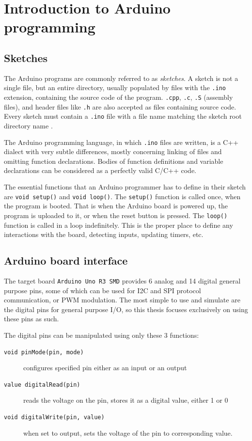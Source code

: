 \chapter{Introduction to Arduino programming} \label{ch:arduino}

\section{Sketches} \label{sec:sketches}

The Arduino programs are commonly referred to as \textit{sketches}. A sketch is not a single file, but an entire directory, usually populated by files with the \texttt{.ino} extension, containing the source code of the program. \texttt{.cpp}, \texttt{.c}, \texttt{.S} (assembly files), and header files like \texttt{.h} are also accepted as files containing source code. Every sketch must contain a \texttt{.ino} file with a file name matching the sketch root directory name \cite{arduino_sketch_specs}.

The Arduino programming language, in which \texttt{.ino} files are written, is a C++ dialect with very subtle differences, mostly concerning linking of files and omitting function declarations. Bodies of function definitions and variable declarations can be considered as a perfectly valid C/C++ code. 

The essential functions that an Arduino programmer has to define in their sketch are \texttt{void setup()} and \texttt{void loop()}. The \texttt{setup()} function is called once, when the program is booted. That is when the Arduino board is powered up, the program is uploaded to it, or when the reset button is pressed. The \texttt{loop()} function is called in a loop indefinitely. This is the proper place to define any interactions with the board, detecting inputs, updating timers, etc.

\section{Arduino board interface} \label{sec:arduino_io}

The target board \texttt{Arduino Uno R3 SMD} provides 6 analog and 14 digital general purpose pins, some of which can be used for I2C and SPI protocol communication, or PWM modulation. The most simple to use and simulate are the digital pins for general purpose I/O, so this thesis focuses exclusively on using these pins as such. \cite{arduino_r3_smd_specs}

The digital pins can be manipulated using only these 3 functions:
\begin{description}
    \item[\texttt{void pinMode(pin, mode)}] configures specified pin either as an input or an output
    \item[\texttt{value digitalRead(pin)}] reads the voltage on the pin, stores it as a digital value, either 1 or 0
    \item[\texttt{void digitalWrite(pin, value)}] when set to output, sets the voltage of the pin to corresponding value.
\end{description}

